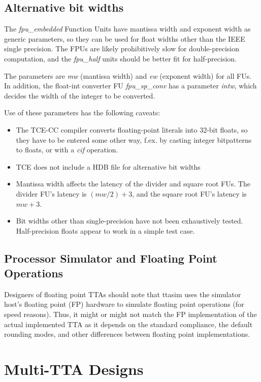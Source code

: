 \documentclass[twoside]{tceusermanual}
\begin{document}
\subsection{Alternative bit widths}

The \emph{fpu\_embedded} Function Units have mantissa width and exponent width as generic 
parameters, so they can be used for float widths other than the IEEE single precision. 
The FPUs are likely prohibitively slow for double-precision computation, and the \emph{fpu\_half} units
should be better fit for half-precision.

The parameters are \emph{mw} (mantissa width) and \emph{ew} (exponent width) for all FUs. In addition, the float-int converter FU 
\emph{fpu\_sp\_conv} has a parameter \emph{intw}, which decides the width of the integer to be 
converted.

Use of these parameters has the following caveats:

\begin{itemize}
    \item The TCE-CC compiler converts floating-point literals into 32-bit floats, so they have to be entered some other way, f.ex. by casting integer bitpatterns to floats, or with a \emph{cif} operation.
    \item TCE does not include a HDB file for alternative bit widths
    \item Mantissa width affects the latency of the divider and square root FUs. The divider FU's latency is $(mw/2)+3$, and the square root FU's latency is $mw+3$.
    \item Bit widths other than single-precision have not been exhaustively tested. Half-precision floats appear to work in a simple test case.
\end{itemize}

\subsection{Processor Simulator and Floating Point Operations}

Designers of floating point TTAs should note that ttasim uses the simulator 
host's floating point (FP) hardware to simulate floating point operations (for 
speed reasons). Thus, it might or might not match the FP implementation of 
the actual implemented TTA as it depends on the standard compliance, the
default rounding modes, and other differences between floating point 
implementations.

\section{Multi-TTA Designs}
\end{document}
